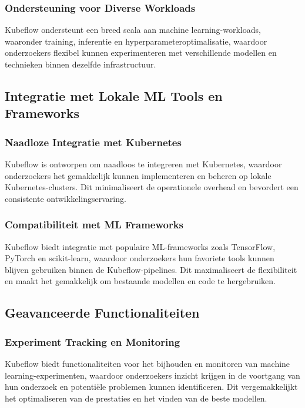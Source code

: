 \subsubsection{Ondersteuning voor Diverse Workloads}
Kubeflow ondersteunt een breed scala aan machine learning-workloads, waaronder training, inferentie en hyperparameteroptimalisatie, waardoor onderzoekers flexibel kunnen experimenteren met verschillende modellen en technieken binnen dezelfde infrastructuur.

\subsection{Integratie met Lokale ML Tools en Frameworks}

\subsubsection{Naadloze Integratie met Kubernetes}
Kubeflow is ontworpen om naadloos te integreren met Kubernetes, waardoor onderzoekers het gemakkelijk kunnen implementeren en beheren op lokale Kubernetes-clusters. Dit minimaliseert de operationele overhead en bevordert een consistente ontwikkelingservaring.

\subsubsection{Compatibiliteit met ML Frameworks}
Kubeflow biedt integratie met populaire ML-frameworks zoals TensorFlow, PyTorch en scikit-learn, waardoor onderzoekers hun favoriete tools kunnen blijven gebruiken binnen de Kubeflow-pipelines. Dit maximaliseert de flexibiliteit en maakt het gemakkelijk om bestaande modellen en code te hergebruiken.

\subsection{Geavanceerde Functionaliteiten}

\subsubsection{Experiment Tracking en Monitoring}
Kubeflow biedt functionaliteiten voor het bijhouden en monitoren van machine learning-experimenten, waardoor onderzoekers inzicht krijgen in de voortgang van hun onderzoek en potentiële problemen kunnen identificeren. Dit vergemakkelijkt het optimaliseren van de prestaties en het vinden van de beste modellen.

